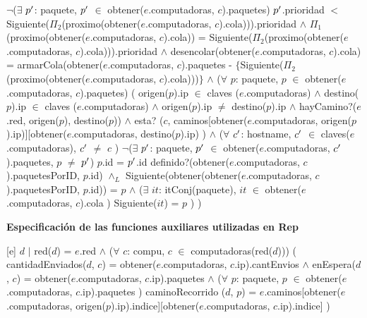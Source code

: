 \begin{Representacion}
{	$\neg$($\exists$ $p\sp{\prime}$: paquete, $p\sp{\prime}$ $\in$ obtener($e$.computadoras, $c$).paquetes) $p\sp{\prime}$.prioridad $<$ Siguiente($\Pi_2$(proximo(obtener($e$.computadoras, $c$).cola))).prioridad $\wedge$ \newline
	$\Pi_1$(proximo(obtener($e$.computadoras, $c$).cola)) = Siguiente($\Pi_2$(proximo(obtener($e$.computadoras, $c$).cola))).prioridad $\wedge$ \newline
	desencolar(obtener($e$.computadoras, $c$).cola) = armarCola(obtener($e$.computadoras, $c$).paquetes - $\{$Siguiente($\Pi_2$(proximo(obtener($e$.computadoras, $c$).cola)))$\}$ $\wedge$
	\newline
	($\forall$ $p$: paquete, $p$ $\in$ obtener($e$.computadoras, $c$).paquetes) (
	 origen($p$).ip $\in$ claves ($e$.computadoras) $\wedge$ 
destino($p$).ip $\in$ claves ($e$.computadoras) $\wedge$ 
	 origen($p$).ip $\neq$ destino($p$).ip $\wedge$ 
	 hayCamino?($e$.red, origen($p$), destino($p$)) $\wedge$ 
	 esta? ($c$, caminos[obtener($e$.computadoras, origen($p$).ip)][obtener($e$.computadoras, destino($p$).ip) ) $\wedge$
	 ($\forall$ $c\sp{\prime}$: hostname, $c\sp{\prime}$ $\in$ claves($e$.computadoras), $c\sp{\prime}$ $\neq$ $c$ )  $\neg$($\exists$ $p\sp{\prime}$: paquete, $p\sp{\prime}$ $\in$ obtener($e$.computadoras, $c\sp{\prime}$).paquetes, $p$ $\neq$ $p\sp{\prime}$) $p$.id = $p\sp{\prime}$.id 
	definido?(obtener($e$.computadoras, $c$).paquetesPorID, $p$.id) $\wedge_L$ \newline
	Siguiente(obtener(obtener($e$.computadoras, $c$).paquetesPorID,  $p$.id)) = $p$  $\wedge$ 
	 ($\exists$ $it$: itConj(paquete), $it$ $\in$ obtener($e$.computadoras, $c$).cola ) 
	Siguiente($it$) = $p$  ) )
}

\newpage

\textbf{Especificaci\'on de las funciones auxiliares utilizadas en Rep}





\textbf{}

[e]{ $d$ $|$ 
red($d$) = $e$.red $\wedge$ \newline
($\forall$ $c$: compu, $c$ $\in$ computadoras(red($d$))) ( \newline
cantidadEnviados($d$, $c$) = obtener($e$.computadoras, $c$.ip).cantEnvios $\wedge$ \newline
enEspera($d$, $c$) = obtener($e$.computadoras, $c$.ip).paquetes $\wedge$ \newline
($\forall$ $p$: paquete, $p$ $\in$  obtener($e$.computadoras, $c$.ip).paquetes ) 
caminoRecorrido ($d$, $p$) = $e$.caminos[obtener($e$.computadoras, origen($p$).ip).indice][obtener($e$.computadoras, $c$.ip).indice] ) 
}


\end{Representacion}
